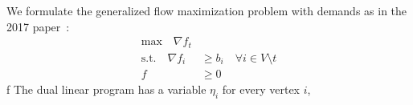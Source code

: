\documentclass[11pt]{article}
\theoremstyle{definition}
\theoremstyle{definition}
\newcommand{\R}{\mathbb{R}}
\newcommand{\rewrite}[1]{\textcolor{red}{#1}}
\begin{document}
	We formulate the generalized flow maximization problem with demands as in the 2017
	paper~\cite{Olver2017}:
	\vspace{-0.35cm}
%
%
    \begin{align*}\tag{P}
    \text{max} \quad
    \nabla f_t& \\
    \text{s.t.} \quad
    \nabla f_i &\geq b_i \quad \forall i \in V \setminus t \\
    f &\geq 0
    \end{align*}f
	The dual linear program has a variable $\eta_i$ for every vertex $i$,
\end{document}
